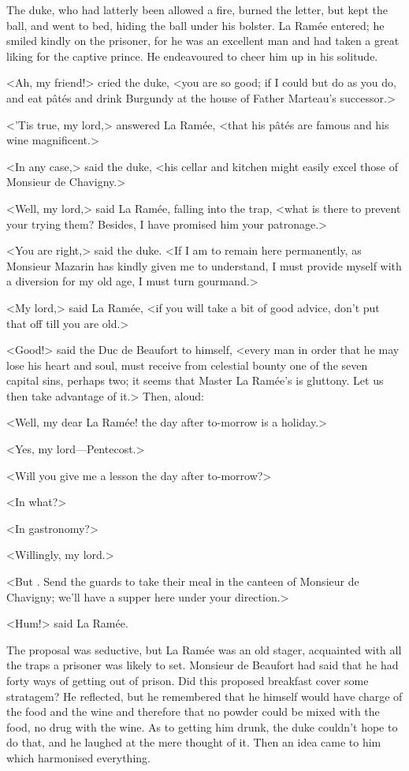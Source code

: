 The duke, who had latterly been allowed a fire, burned the letter, but kept the ball, and went to bed, hiding the ball under his bolster. La Ramée entered; he smiled kindly on the prisoner, for he was an excellent man and had taken a great liking for the captive prince. He endeavoured to cheer him up in his solitude.

<Ah, my friend!> cried the duke, <you are so good; if I could but do as you do, and eat pâtés and drink Burgundy at the house of Father Marteau's successor.>

<'Tis true, my lord,> answered La Ramée, <that his pâtés are famous and his wine magnificent.>

<In any case,> said the duke, <his cellar and kitchen might easily excel those of Monsieur de Chavigny.>

<Well, my lord,> said La Ramée, falling into the trap, <what is there to prevent your trying them? Besides, I have promised him your patronage.>

<You are right,> said the duke. <If I am to remain here permanently, as Monsieur Mazarin has kindly given me to understand, I must provide myself with a diversion for my old age, I must turn gourmand.>

<My lord,> said La Ramée, <if you will take a bit of good advice, don't put that off till you are old.>

<Good!> said the Duc de Beaufort to himself, <every man in order that he may lose his heart and soul, must receive from celestial bounty one of the seven capital sins, perhaps two; it seems that Master La Ramée's is gluttony. Let us then take advantage of it.> Then, aloud:

<Well, my dear La Ramée! the day after to-morrow is a holiday.>

<Yes, my lord—Pentecost.>

<Will you give me a lesson the day after to-morrow?>

<In what?>

<In gastronomy?>

<Willingly, my lord.>

<But . Send the guards to take their meal in the canteen of Monsieur de Chavigny; we'll have a supper here under your direction.>

<Hum!> said La Ramée.

The proposal was seductive, but La Ramée was an old stager, acquainted with all the traps a prisoner was likely to set. Monsieur de Beaufort had said that he had forty ways of getting out of prison. Did this proposed breakfast cover some stratagem? He reflected, but he remembered that he himself would have charge of the food and the wine and therefore that no powder could be mixed with the food, no drug with the wine. As to getting him drunk, the duke couldn't hope to do that, and he laughed at the mere thought of it. Then an idea came to him which harmonised everything.

